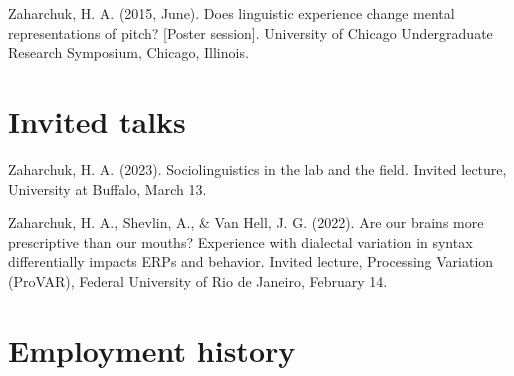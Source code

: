 \documentclass[11pt,a4paper,]{awesome-cv}
\begin{document}
\leavevmode{}%
Zaharchuk, H. A. (2015, June). Does linguistic experience change mental
representations of pitch? {[}Poster session{]}. University of Chicago
Undergraduate Research Symposium, Chicago, Illinois.

\hypertarget{invited-talks}{%
\section{Invited talks}\label{invited-talks}}

\hypertarget{bibliography}{}
\leavevmode{}%
Zaharchuk, H. A. (2023). Sociolinguistics in the lab and the field.
Invited lecture, University at Buffalo, March 13.

\leavevmode{}%
Zaharchuk, H. A., Shevlin, A., \& Van Hell, J. G. (2022). Are our brains
more prescriptive than our mouths? Experience with dialectal variation
in syntax differentially impacts ERPs and behavior. Invited lecture,
Processing Variation (ProVAR), Federal University of Rio de Janeiro,
February 14.

\hypertarget{employment-history}{%
\section{Employment history}\label{employment-history}}
\end{document}
